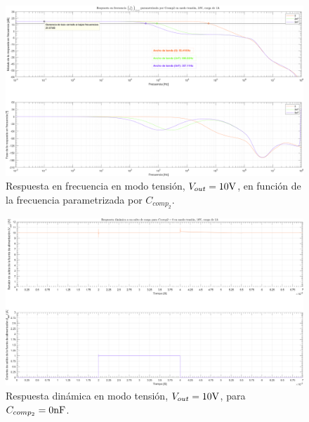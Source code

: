 \begin{figure}[H] %
\begin{center}
\includegraphics[width=1.1 \textwidth, angle=90]{./img/plots/rf/power_supply_CCOMP2_RF_Modo1.png}
\caption{\label{fig:fig_power_supply_CCOMP2_RF_Modo1}\footnotesize{Respuesta en frecuencia en modo tensión, $V_{out} = 10 \si[per-mode=symbol]{\volt}$, en función de la frecuencia parametrizada por $C_{comp_{2}}$.}}
\end{center}
\end{figure}

\clearpage

\begin{figure}[H] %
\begin{center}
\includegraphics[width=1.1 \textwidth, angle=90]{./img/plots/dynamic/power_supply_CCOMP2_0_STEP_Modo1.png}
\caption{\label{fig:fig_power_supply_CCOMP2_STEP_0_Modo1}\footnotesize{Respuesta dinámica en modo tensión, $V_{out} = 10 \si[per-mode=symbol]{\volt}$, para $C_{comp_{2}} = 0 \si[per-mode=symbol]{\nano\farad} $.}}
\end{center}
\end{figure}

